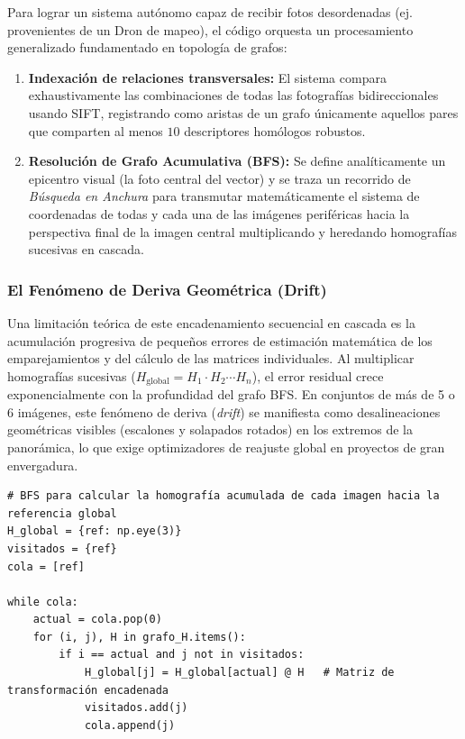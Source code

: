 \documentclass[12pt,a4paper]{article}
\begin{document}
Para lograr un sistema autónomo capaz de recibir fotos desordenadas (ej. provenientes de un Dron de mapeo), el código orquesta un procesamiento generalizado fundamentado en topología de grafos:
\begin{enumerate}
    \item \textbf{Indexación de relaciones transversales:} El sistema compara exhaustivamente las combinaciones de todas las fotografías bidireccionales usando SIFT, registrando como aristas de un grafo únicamente aquellos pares que comparten al menos $10$ descriptores homólogos robustos.
    \item \textbf{Resolución de Grafo Acumulativa (BFS):} Se define analíticamente un epicentro visual (la foto central del vector) y se traza un recorrido de \textit{Búsqueda en Anchura} para transmutar matemáticamente el sistema de coordenadas de todas y cada una de las imágenes periféricas hacia la perspectiva final de la imagen central multiplicando y heredando homografías sucesivas en cascada.
\end{enumerate}

\subsubsection*{El Fenómeno de Deriva Geométrica (Drift)}
Una limitación teórica de este encadenamiento secuencial en cascada es la acumulación progresiva de pequeños errores de estimación matemática de los emparejamientos y del cálculo de las matrices individuales. Al multiplicar homografías sucesivas ($H_{\text{global}} = H_1 \cdot H_2 \cdots H_n$), el error residual crece exponencialmente con la profundidad del grafo BFS. En conjuntos de más de 5 o 6 imágenes, este fenómeno de deriva (\textit{drift}) se manifiesta como desalineaciones geométricas visibles (escalones y solapados rotados) en los extremos de la panorámica, lo que exige optimizadores de reajuste global en proyectos de gran envergadura.

\begin{verbatim}
# BFS para calcular la homografía acumulada de cada imagen hacia la referencia global
H_global = {ref: np.eye(3)}
visitados = {ref}
cola = [ref]

while cola:
    actual = cola.pop(0)
    for (i, j), H in grafo_H.items():
        if i == actual and j not in visitados:
            H_global[j] = H_global[actual] @ H   # Matriz de transformación encadenada
            visitados.add(j)
            cola.append(j)
\end{verbatim}
\end{document}
